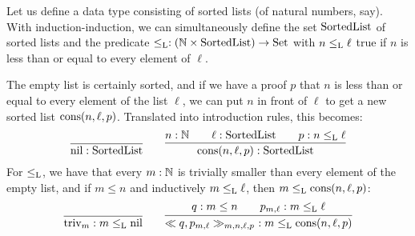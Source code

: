 \documentclass{article}
\begin{document}
\begin{example}
\label{ex:sorted-list}

Let us define a data type consisting of sorted lists (of natural
numbers, say). With induction-induction, we can simultaneously define
the set $\text{SortedList}$ of sorted lists and the predicate $\leq_{\text{L}} :
(\mathbb{N} \times \text{SortedList}) \to \text{Set}$ with $n \leq_{\text{L}} \ell$ true if
$n$ is less than or equal to every element of $\ell$.

The empty list is certainly sorted, and if we have a proof $p$ that
$n$ is less than or equal to every element of the list $\ell$, we can
put $n$ in front of $\ell$ to get a new sorted list
$\text{cons}(n, \ell, p)$. Translated into introduction rules, this becomes:
\[
\infer{\nilList : \SortedList}{} \qquad
\infer{\consList{n}{\ell}{p} : \SortedList}{n : \Nat \quad & \ell : \SortedList \quad & p : n \lessList \ell}
\]
For $\leq_{\text{L}}$, we have that every $m : \mathbb{N}$ is trivially smaller
than every element of the empty list, and if $m \leq n$ and
inductively $m \leq_{\text{L}} \ell$, then $m \leq_{\text{L}} \text{cons}(n, \ell, p)$:
\[
\infer{\nilLess{m} : m \lessList \nilList}
{} \qquad
\infer{\consLess{n}{\ell}{p}{m}{q}{p_{m, \ell}}\ : m \lessList \consList{n}{\ell}{p}}
       {q : m \leq n \quad & p_{m, \ell} : m \lessList \ell}
\]
%


\blackqed
\end{example}
\end{document}
